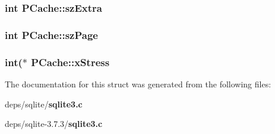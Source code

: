 \subsubsection{\setlength{\rightskip}{0pt plus 5cm}int \bf{PCache::sz\-Extra}}\label{structPCache_6912cfebdc6669ace0515bd78e2e1c4f}


\subsubsection{\setlength{\rightskip}{0pt plus 5cm}int \bf{PCache::sz\-Page}}\label{structPCache_8895bd9cb491ac031df1a12de53d9ac5}


\subsubsection{\setlength{\rightskip}{0pt plus 5cm}int($\ast$ \bf{PCache::x\-Stress}}\label{structPCache_b77d51cdaa522691af56224dbb23bec5}




The documentation for this struct was generated from the following files:\begin{CompactItemize}
\item 
deps/sqlite/\bf{sqlite3.c}\item 
deps/sqlite-3.7.3/\bf{sqlite3.c}\end{CompactItemize}
